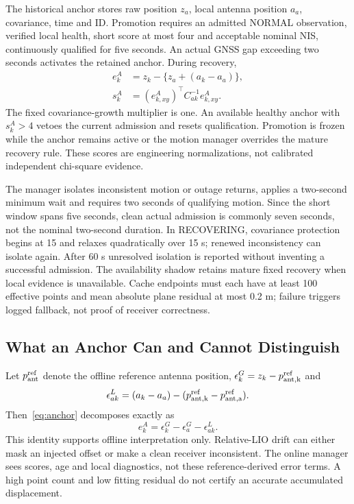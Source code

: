\documentclass[conference]{IEEEtran}
\begin{document}
The historical anchor stores raw position $z_a$, local antenna position $a_a$, covariance, time and ID. Promotion requires an admitted NORMAL observation, verified local health, short score at most four and acceptable nominal NIS, continuously qualified for five seconds. An actual GNSS gap exceeding two seconds activates the retained anchor. During recovery,
\begin{align}
 e_k^A &= z_k-\{z_a+(a_k-a_a)\},\label{eq:anchor}\\
 s_k^A &= (e_{k,xy}^A)^\top C_{ak}^{-1}e_{k,xy}^A.
\end{align}
The fixed covariance-growth multiplier is one. An available healthy anchor with $s_k^A>4$ vetoes the current admission and resets qualification. Promotion is frozen while the anchor remains active or the motion manager overrides the mature recovery rule. These scores are engineering normalizations, not calibrated independent chi-square evidence.

The manager isolates inconsistent motion or outage returns, applies a two-second minimum wait and requires two seconds of qualifying motion. Since the short window spans five seconds, clean actual admission is commonly seven seconds, not the nominal two-second duration. In RECOVERING, covariance protection begins at 15 and relaxes quadratically over 15 s; renewed inconsistency can isolate again. After 60 s unresolved isolation is reported without inventing a successful admission. The availability shadow retains mature fixed recovery when local evidence is unavailable. Cache endpoints must each have at least 100 effective points and mean absolute plane residual at most 0.2 m; failure triggers logged fallback, not proof of receiver correctness.

\subsection{What an Anchor Can and Cannot Distinguish}
Let $p^{\rm ref}_{\rm ant}$ denote the offline reference antenna position, $\epsilon^G_k=z_k-p^{\rm ref}_{\rm ant,k}$ and
\begin{equation}
 \epsilon^L_{ak}=(a_k-a_a)-(p^{\rm ref}_{\rm ant,k}-p^{\rm ref}_{\rm ant,a}).
\end{equation}
Then~\eqref{eq:anchor} decomposes exactly as
\begin{equation}
 e_k^A=\epsilon^G_k-\epsilon^G_a-\epsilon^L_{ak}.\label{eq:decomp}
\end{equation}
This identity supports offline interpretation only. Relative-LIO drift can either mask an injected offset or make a clean receiver inconsistent. The online manager sees scores, age and local diagnostics, not these reference-derived error terms. A high point count and low fitting residual do not certify an accurate accumulated displacement.
\end{document}

